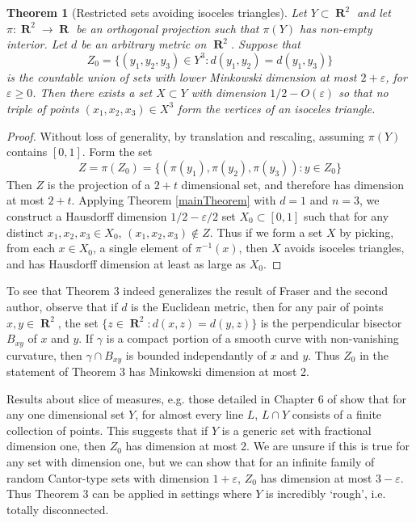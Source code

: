 \documentclass[dvipsnames,letterpaper,12pt]{article}
\theoremstyle{plain}
\newtheorem{theorem}{Theorem}
\DeclareMathOperator{\RR}{\mathbf{R}}
\begin{document}
\begin{theorem}[Restricted sets avoiding isoceles triangles]
	Let $Y \subset \RR^2$ and let $\pi: \RR^2 \to \RR$ be an orthogonal projection such that $\pi(Y)$ has non-empty interior. Let $d$ be an arbitrary metric on $\RR^2$. Suppose that
	\[ Z_0 = \{ (y_1, y_2, y_3) \in Y^3: d(y_1,y_2) = d(y_1,y_3) \} \]
	is the countable union of sets with lower Minkowski dimension at most $2 + \varepsilon$, for $\varepsilon \geq 0$. Then there exists a set $X \subset Y$ with dimension $1/2 - O(\varepsilon)$ so that no triple of points $(x_1, x_2, x_3) \in X^3$ form the vertices of an isoceles triangle.
\end{theorem}
\begin{proof}
	Without loss of generality, by translation and rescaling, assuming $\pi(Y)$ contains $[0,1]$. Form the set
	\[ Z = \pi(Z_0) = \{ (\pi(y_1), \pi(y_2), \pi(y_3)) : y \in Z_0 \} \]
	Then $Z$ is the projection of a $2 + t$ dimensional set, and therefore has dimension at most $2 + t$. Applying Theorem \ref{mainTheorem} with $d = 1$ and $n = 3$, we construct a Hausdorff dimension $1/2 - \varepsilon/2$ set $X_0 \subset [0,1]$ such that for any distinct $x_1,x_2,x_3 \in X_0$, $(x_1,x_2,x_3) \not \in Z$. Thus if we form a set $X$ by picking, from each $x \in X_0$, a single element of $\pi^{-1}(x)$, then $X$ avoids isoceles triangles, and has Hausdorff dimension at least as large as $X_0$.
\end{proof}

To see that Theorem 3 indeed generalizes the result of Fraser and the second author, observe that if $d$ is the Euclidean metric, then for any pair of points $x,y \in \RR^2$, the set $\{ z \in \RR^2: d(x,z) = d(y,z) \}$ is the perpendicular bisector $B_{xy}$ of $x$ and $y$. If $\gamma$ is a compact portion of a smooth curve with non-vanishing curvature, then $\gamma \cap B_{xy}$ is bounded independantly of $x$ and $y$. Thus $Z_0$ in the statement of Theorem 3 has Minkowski dimension at most 2.

Results about slice of measures, e.g. those detailed in Chapter 6 of \cite{Matilla} show that for any one dimensional set $Y$, for almost every line $L$, $L \cap Y$ consists of a finite collection of points. This suggests that if $Y$ is a generic set with fractional dimension one, then $Z_0$ has dimension at most 2. We are unsure if this is true for any set with dimension one, but we can show that for an infinite family of random Cantor-type sets with dimension $1 + \varepsilon$, $Z_0$ has dimension at most $3 - \varepsilon$. Thus Theorem 3 can be applied in settings where $Y$ is incredibly `rough', i.e. totally disconnected.
\end{document}
